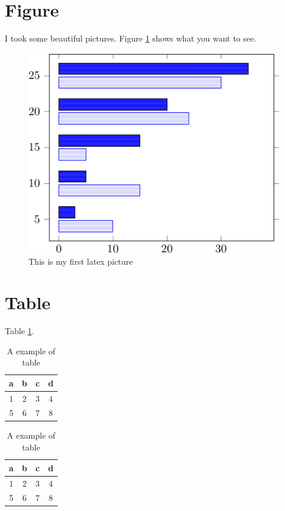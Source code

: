 \documentclass[12pt]{article}
\begin{document}
\section{Figure}
I took some beautiful pictures. Figure \ref{fig:lapic} shows what you want to see.

\begin{figure}[htb]
\centering
\includegraphics[scale=0.7]{fig1}
\caption{This is my first latex picture}\label{fig:lapic}
\end{figure}

\section{Table}

Table \ref{tab:example}.

\begin{table}[!htb]
\centering
\caption{A example of table}\label{tab:example}
\begin{tabular}{|c|c|c|c|}
\hline 
a & b & c & d\\
\hline 
1 & 2 & 3 & 4 \\
\hline 
5 & 6 & 7 & 8 \\
\hline 
\end{tabular}
\end{table}



\begin{table}[!htb]
\centering
\caption{A example of table}\label{tab:example2}
\begin{tabular}{|c|c|c|c|}
\hline 
a & b & c & d\\
\hline 
1 & 2 & 3 & 4 \\
\hline 
5 & 6 & 7 & 8 \\
\hline 
\end{tabular}
\end{table}
\end{document}
